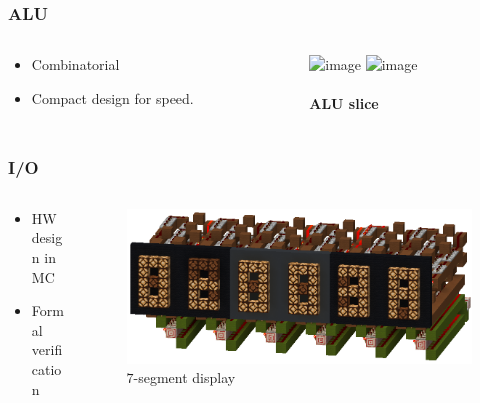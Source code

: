 \documentclass[aspectratio=169]{beamer}
\newcommand{\hw}{HW}
\begin{document}
\begin{frame}
	\frametitle{ALU}
	\begin{columns}
		\begin{column}{0.4\textwidth}
			\begin{itemize}
				\item Combinatorial
				\item Compact design for speed.
			\end{itemize}
		\end{column}
		\begin{column}{0.6\textwidth}
			\begin{center}
				\includegraphics<1>[width=\textwidth]{imgs/alu_slice.png}
				\includegraphics<2->[width=0.8\textwidth]{imgs/alu.png}

				\framesubtitle<1>{ALU slice}
			\end{center}
		\end{column}
	\end{columns}
\end{frame}

\begin{frame}
	\frametitle{I/O}
	\begin{columns}
		\begin{column}{0.4\textwidth}
			\begin{itemize}
				\item \hw{} design in MC
				\item Formal verification
			\end{itemize}
		\end{column}
		\begin{column}{0.6\textwidth}
			\begin{figure}
				\includegraphics[width=\textwidth]{imgs/screen.png}
				\caption*{$7$-segment display}
			\end{figure}
		\end{column}
	\end{columns}
\end{frame}
\end{document}
